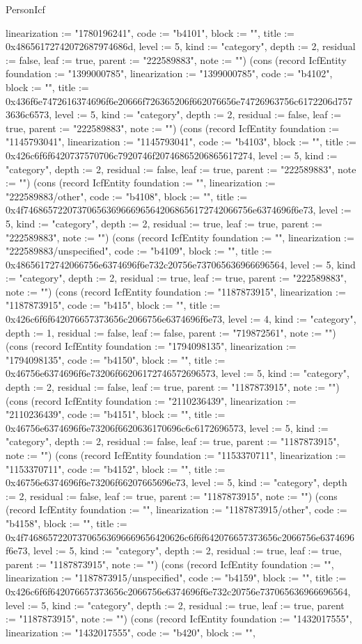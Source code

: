 \begin{lexlean}{PersonIcf}
\begin{semanticmodule}
{linearization := "1780196241", code := "b4101", block := "", title := 0x48656172742072687974686d, level := 5, kind := "category", depth := 2, residual := false, leaf := true, parent := "222589883", note := ""}) (cons (record IcfEntity {foundation := "1399000785", linearization := "1399000785", code := "b4102", block := "", title := 0x436f6e7472616374696f6e20666f726365206f662076656e74726963756c6172206d7573636c6573, level := 5, kind := "category", depth := 2, residual := false, leaf := true, parent := "222589883", note := ""}) (cons (record IcfEntity {foundation := "1145793041", linearization := "1145793041", code := "b4103", block := "", title := 0x426c6f6f6420737570706c7920746f20746865206865617274, level := 5, kind := "category", depth := 2, residual := false, leaf := true, parent := "222589883", note := ""}) (cons (record IcfEntity {foundation := "", linearization := "222589883/other", code := "b4108", block := "", title := 0x4f74686572207370656369666965642068656172742066756e6374696f6e73, level := 5, kind := "category", depth := 2, residual := true, leaf := true, parent := "222589883", note := ""}) (cons (record IcfEntity {foundation := "", linearization := "222589883/unspecified", code := "b4109", block := "", title := 0x48656172742066756e6374696f6e732c20756e737065636966696564, level := 5, kind := "category", depth := 2, residual := true, leaf := true, parent := "222589883", note := ""}) (cons (record IcfEntity {foundation := "1187873915", linearization := "1187873915", code := "b415", block := "", title := 0x426c6f6f642076657373656c2066756e6374696f6e73, level := 4, kind := "category", depth := 1, residual := false, leaf := false, parent := "719872561", note := ""}) (cons (record IcfEntity {foundation := "1794098135", linearization := "1794098135", code := "b4150", block := "", title := 0x46756e6374696f6e73206f66206172746572696573, level := 5, kind := "category", depth := 2, residual := false, leaf := true, parent := "1187873915", note := ""}) (cons (record IcfEntity {foundation := "2110236439", linearization := "2110236439", code := "b4151", block := "", title := 0x46756e6374696f6e73206f6620636170696c6c6172696573, level := 5, kind := "category", depth := 2, residual := false, leaf := true, parent := "1187873915", note := ""}) (cons (record IcfEntity {foundation := "1153370711", linearization := "1153370711", code := "b4152", block := "", title := 0x46756e6374696f6e73206f66207665696e73, level := 5, kind := "category", depth := 2, residual := false, leaf := true, parent := "1187873915", note := ""}) (cons (record IcfEntity {foundation := "", linearization := "1187873915/other", code := "b4158", block := "", title := 0x4f746865722073706563696669656420626c6f6f642076657373656c2066756e6374696f6e73, level := 5, kind := "category", depth := 2, residual := true, leaf := true, parent := "1187873915", note := ""}) (cons (record IcfEntity {foundation := "", linearization := "1187873915/unspecified", code := "b4159", block := "", title := 0x426c6f6f642076657373656c2066756e6374696f6e732c20756e737065636966696564, level := 5, kind := "category", depth := 2, residual := true, leaf := true, parent := "1187873915", note := ""}) (cons (record IcfEntity {foundation := "1432017555", linearization := "1432017555", code := "b420", block := "", }
\end{semanticmodule}
\end{lexlean}
